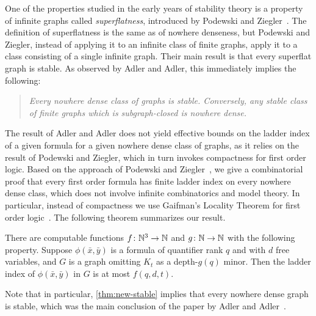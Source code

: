   
  One of the properties studied in the early 
  years of stability theory is 
  a property of infinite graphs  called \emph{superflatness}, introduced by Podewski and Ziegler~\cite{podewski1978stable}.
  The definition of superflatness is the same as   of nowhere denseness, but 
   Podewski and Ziegler,
  instead of applying it to an infinite class of finite graphs, apply it to a class consisting of a single infinite graph.
  Their main result is that every superflat graph is stable.   
As observed by Adler and Adler, 
this
 immediately implies  the following:
 \begin{quote}\itshape
 	Every nowhere dense class of graphs is stable. Conversely, any stable class of finite graphs which is subgraph-closed  is nowhere dense.
 \end{quote}
 The result of Adler and Adler 
 does not yield effective bounds on the 
 ladder index of a given formula for a given nowhere dense class of graphs, as it relies on the result of Podewski and Ziegler, which in turn invokes compactness for first order logic.
Based on the approach of Podewski and Ziegler~\cite{podewski1978stable}, we give a combinatorial 
proof that every first order formula has finite ladder index on every
nowhere dense class, which does not involve infinite combinatorics and model theory.
In particular, instead of compactness we use Gaifman's Locality Theorem for
first order logic~\cite{gaifman1982local}. The following theorem summarizes our result.

\begin{theorem}\label{thm:new-stable}
  There are computable functions $f\colon \mathbb{N}^3\to\mathbb{N}$ and $g\colon\mathbb{N}\to\mathbb{N}$ with the following property.
Suppose $\phi(\bar x,\bar y)$ is a formula of quantifier rank $q$ and with $d$ free variables,
and $G$ is a graph omitting $K_t$ as a depth-$g(q)$ minor. Then the ladder index of $\phi(\bar x,\bar y)$ in $G$ is at most $f(q,d,t)$.
\end{theorem}
Note that in particular, \cref{thm:new-stable} implies that every nowhere dense graph is stable, which was the main conclusion of the paper by Adler and Adler~\cite{adler2014interpreting}. 
 
 
